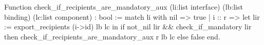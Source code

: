 Function check_if_recipients_are_mandatory_aux (li:list interface) 
                      (lb:list binding) (lc:list component) : bool :=
  match li with
    nil    => true
  | i :: r => let lir := export_recipients (i->id) lb lc in
              if not_nil lir && check_if_mandatory lir then
                check_if_recipients_are_mandatory_aux r lb lc
              else
                false
  end.